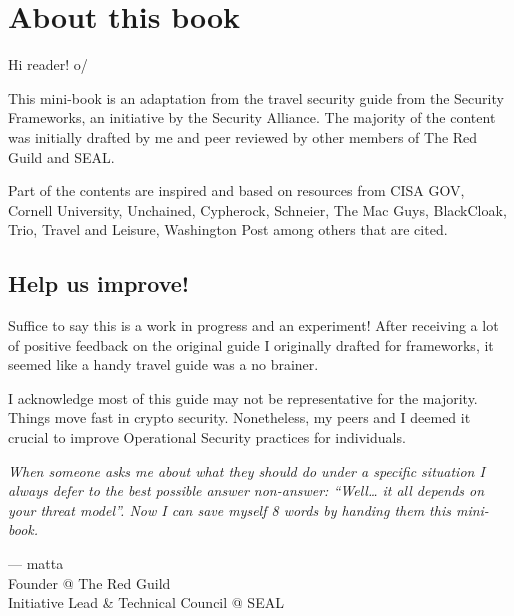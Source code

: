 \chapter{About this book}

Hi reader! o/

This mini-book is an adaptation from the travel security
guide from the Security Frameworks, an initiative by the
Security Alliance. The majority of the content was
initially drafted by me and peer reviewed by other
members of The Red Guild and SEAL.

Part of the contents are inspired and based on resources
from CISA GOV, Cornell University, Unchained, Cypherock,
Schneier, The Mac Guys, BlackCloak, Trio, Travel and
Leisure, Washington Post among others that are cited.

\section{Help us improve!}

Suffice to say this is a work in progress and an
experiment! After receiving a lot of positive feedback on
the original guide I originally drafted for frameworks, it
seemed like a handy travel guide was a no brainer.

I acknowledge most of this guide may not be representative
for the majority. Things move fast in crypto security.
Nonetheless, my peers and I deemed it crucial to improve
Operational Security practices for individuals.

{\itshape When someone asks me about what they should do
under a specific situation I always defer to the best
possible answer non-answer: ``Well\ldots{} it all depends
on your threat model''. Now I can save myself 8 words by
handing them this mini-book.}

\vspace{1.5mm}
{\raggedright --- matta\\
Founder @ The Red Guild\\
Initiative Lead \& Technical Council @ SEAL\par}


